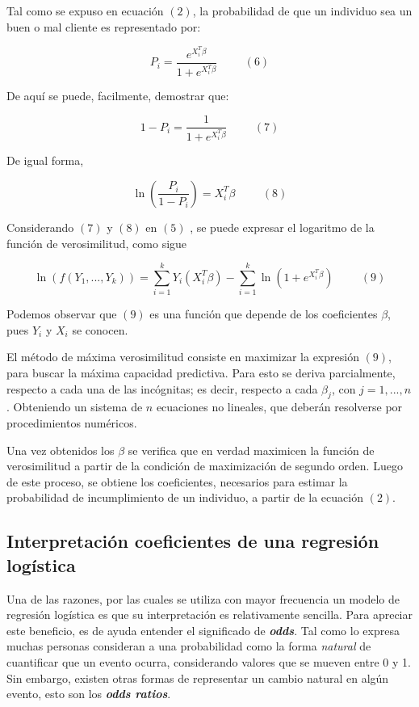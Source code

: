 \documentclass[
  letterpaper,
]{tex/svmono}
\begin{document}
Tal como se expuso en ecuación \((2)\), la probabilidad de que un
individuo sea un buen o mal cliente es representado por:

\[
P_i = \frac{e^{X_i^T\beta}}{1 + e^{X_i^T\beta}} \hspace{1cm} (6)
\]

De aquí se puede, facilmente, demostrar que:

\[
1 - P_i = \frac{1}{1 + e^{X_i^T\beta}}\hspace{1cm}(7)
\]

De igual forma,

\[
\ln\left(\frac{P_i}{1-P_i}\right) = X_i^T\beta\hspace{1cm} (8)
\]

Considerando \((7)\) y \((8)\) en \((5)\) , se puede expresar el
logaritmo de la función de verosimilitud, como sigue

\[
\ln\left(f(Y_1, . . . , Y_k)\right) = \sum_{i=1}^{k}Y_i(X_i^T\beta) - \sum_{i=1}^{k}\ln\left(1 + e^{X_i^T\beta}\right)\hspace{1cm} (9)
\]

Podemos observar que \((9)\) es una función que depende de los
coeficientes \(\beta\), pues \(Y_i\) y \(X_i\) se conocen.

El método de máxima verosimilitud consiste en maximizar la expresión
\((9)\), para buscar la máxima capacidad predictiva. Para esto se deriva
parcialmente, respecto a cada una de las incógnitas; es decir, respecto
a cada \(\beta_j\), con \(j = 1, . . . , n\). Obteniendo un sistema de
\(n\) ecuaciones no lineales, que deberán resolverse por procedimientos
numéricos.

Una vez obtenidos los \(\beta\) se verifica que en verdad maximicen la
función de verosimilitud a partir de la condición de maximización de
segundo orden. Luego de este proceso, se obtiene los coeficientes,
necesarios para estimar la probabilidad de incumplimiento de un
individuo, a partir de la ecuación \((2)\).

\hypertarget{interpretaciuxf3n-coeficientes-de-una-regresiuxf3n-loguxedstica}{%
\subsection{Interpretación coeficientes de una regresión
logística}\label{interpretaciuxf3n-coeficientes-de-una-regresiuxf3n-loguxedstica}}

Una de las razones, por las cuales se utiliza con mayor frecuencia un
modelo de regresión logística es que su interpretación es relativamente
sencilla. Para apreciar este beneficio, es de ayuda entender el
significado de \textbf{\emph{odds}}. Tal como lo expresa \citep{Allison}
muchas personas consideran a una probabilidad como la forma
\emph{natural} de cuantificar que un evento ocurra, considerando valores
que se mueven entre 0 y 1. Sin embargo, existen otras formas de
representar un cambio natural en algún evento, esto son los
\textbf{\emph{odds ratios}}.
\end{document}
